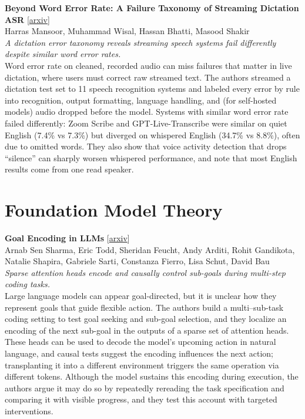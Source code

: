 \documentclass[12pt,letterpaper]{article}
\begin{document}
\medskip
\begin{minipage}{\linewidth}
{\small\textbf{Beyond Word Error Rate: A Failure Taxonomy of Streaming Dictation ASR}} {\scriptsize[\href{https://arxiv.org/abs/2611.16919}{arxiv}]}\\
{\scriptsize Harras Mansoor, Muhammad Wisal, Hassan Bhatti, Masood Shakir}\\
{\footnotesize\textit{A dictation error taxonomy reveals streaming speech systems fail differently despite similar word error rates.}}\\[2pt]
{\footnotesize Word error rate on cleaned, recorded audio can miss failures that matter in live dictation, where users must correct raw streamed text. The authors streamed a dictation test set to 11 speech recognition systems and labeled every error by rule into recognition, output formatting, language handling, and (for self-hosted models) audio dropped before the model. Systems with similar word error rate failed differently: Zoom Scribe and GPT-Live-Transcribe were similar on quiet English (7.4\% vs 7.3\%) but diverged on whispered English (34.7\% vs 8.8\%), often due to omitted words. They also show that voice activity detection that drops ``silence'' can sharply worsen whispered performance, and note that most English results come from one read speaker.}
\end{minipage}

\medskip
\section*{Foundation Model Theory}
\begin{minipage}{\linewidth}
{\small\textbf{Goal Encoding in LLMs}} {\scriptsize[\href{https://arxiv.org/abs/2611.17297}{arxiv}]}\\
{\scriptsize Arnab Sen Sharma, Eric Todd, Sheridan Feucht, Andy Arditi, Rohit Gandikota, Natalie Shapira, Gabriele Sarti, Constanza Fierro, Lisa Schut, David Bau}\\
{\footnotesize\textit{Sparse attention heads encode and causally control sub-goals during multi-step coding tasks.}}\\[2pt]
{\footnotesize Large language models can appear goal-directed, but it is unclear how they represent goals that guide flexible action. The authors build a multi--sub-task coding setting to test goal seeking and sub-goal selection, and they localize an encoding of the next sub-goal in the outputs of a sparse set of attention heads. These heads can be used to decode the model's upcoming action in natural language, and causal tests suggest the encoding influences the next action; transplanting it into a different environment triggers the same operation via different tokens. Although the model sustains this encoding during execution, the authors argue it may do so by repeatedly rereading the task specification and comparing it with visible progress, and they test this account with targeted interventions.}
\end{minipage}
\end{document}
